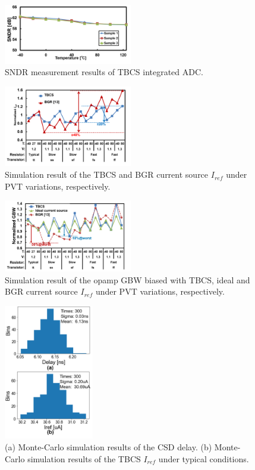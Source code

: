 \documentclass[paper]{ieice}
\begin{document}
\begin{figure}[!t]
\centering
 \includegraphics[width=0.5\textwidth]{figs/sndr.png}
  \caption{SNDR measurement results of TBCS integrated ADC.}
\label{sndr}
\end{figure}

\begin{figure}[!t]
\centering
 \includegraphics[width=0.5\textwidth]{figs/pvt.png}
  \caption{Simulation result of the TBCS and BGR current source $I_{ref}$ under PVT variations, respectively.
}
\label{iref_pvt_both}
\end{figure}

\begin{figure}[!t]
\centering
 \includegraphics[width=0.5\textwidth]{figs/pvt_gbw.png}
  \caption{Simulation result of the opamp GBW biased with TBCS, ideal and BGR current source $I_{ref}$ under PVT variations, respectively.
}
\label{iref_gbw}
\end{figure}

\begin{figure}[!t]
\centering
 \includegraphics[width=0.35\textwidth]{figs/mc.png}
  \caption{(a) Monte-Carlo simulation results of the CSD delay. (b) Monte-Carlo simulation results of the TBCS $I_{ref}$ under typical conditions.
}
\label{monte}
\end{figure}
\end{document}
